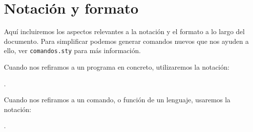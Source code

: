 \section*{Notación y formato}

Aquí incluiremos los aspectos relevantes a la notación y el formato a
lo largo del documento. Para simplificar podemos generar comandos
nuevos que nos ayuden a ello, ver \texttt{comandos.sty} para más
información. 

Cuando nos refiramos a un programa en concreto, utilizaremos la
notación: 

.

Cuando nos refiramos a un comando, o función de un lenguaje, usaremos
la notación: 

.